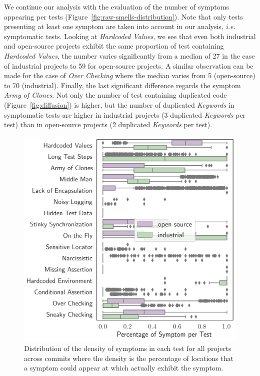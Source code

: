 We continue our analysis with the evaluation of the number of symptoms appearing per tests (Figure~\ref{fig:raw-smells-distribution}). Note that only tests presenting at least one symptom are taken into account in our analysis, \emph{i.e.} symptomatic tests. Looking at \emph{Hardcoded Values}, we see that even both industrial and open-source projects exhibit the same proportion of test containing \emph{Hardcoded Values}, the number varies significantly from a median of 27 in the case of industrial projects to 59 for open-source projects. A similar observation can be made for the case of \emph{Over Checking} where the median varies from 5 (open-source) to 70 (industrial). Finally, the last significant difference regards the symptom \emph{Army of Clones}. Not only the number of test containing duplicated code (Figure~\ref{fig:diffusion}) is higher, but the number of duplicated \emph{Keywords} in symptomatic tests are higher in industrial projects (3 duplicated \emph{Keywords} per test) than in open-source projects (2 duplicated \emph{Keywords} per test).

\begin{figure}
\centering
\includegraphics[width=0.9\linewidth]{figures/smells/smell-normalized-distribution-boxplot.png}
\caption{Distribution of the density of symptoms in each test for all projects across commits where the density is the percentage of locations that a symptom could appear at which actually exhibit the symptom.}  
\label{fig:normalized-smells-distribution}
\end{figure}

